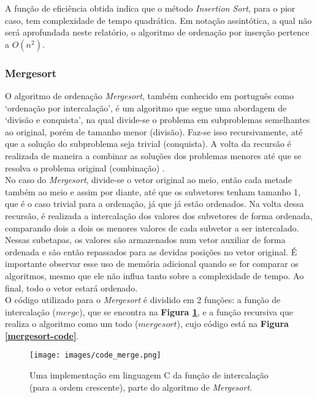 \documentclass[fontsize=10pt]{article}
\begin{document}
A função de eficiência obtida indica que o método \textit{Insertion Sort}, para o pior caso, tem complexidade de tempo quadrática. Em notação assintótica, a qual não será aprofundada neste relatório, o algoritmo de ordenação por inserção pertence a $O(n^2)$.

\subsubsection{Mergesort}
\label{mer}

O algoritmo de ordenação \textit{Mergesort}, também conhecido em português como `ordenação por intercalação', é um algoritmo que segue uma abordagem de `divisão e conquista', na qual divide-se o problema em subproblemas semelhantes ao original, porém de tamanho menor (divisão). Faz-se isso recursivamente, até que a solução do subproblema seja trivial (conquista). A volta da recursão é realizada de maneira a combinar as soluções dos problemas menores até que se resolva o problema original (combinação) \cite[p. 35]{cormen}.\\

No caso do \textit{Mergesort}, divide-se o vetor original ao meio, então cada metade também ao meio e assim por diante, até que os subvetores tenham tamanho 1, que é o caso trivial para a ordenação, já que já estão ordenados. Na volta dessa recursão, é realizada a intercalação dos valores dos subvetores de forma ordenada, comparando dois a dois os menores valores de cada subvetor a ser intercalado. Nessas subetapas, os valores são armazenados num vetor auxiliar de forma ordenada e são então repassados para as devidas posições no vetor original. É importante observar esse uso de memória adicional quando se for comparar os algoritmos, mesmo que ele não influa tanto sobre a complexidade de tempo. Ao final, todo o vetor estará ordenado.\\

O código utilizado para o \textit{Mergesort} é dividido em 2 funções: a função de intercalação ($merge$), que se encontra na \textbf{Figura \ref{merge-code}}, e a função recursiva que realiza o algoritmo como um todo ($mergesort$), cujo código está na \textbf{Figura \ref{mergesort-code}}.

\begin{figure}[H]
\centering
\texttt{[image: images/code\_merge.png]}
\caption{Uma implementação em linguagem C da função de intercalação (para a ordem crescente), parte do algoritmo de \textit{Mergesort}.}
\label{merge-code}
\end{figure}
\end{document}
